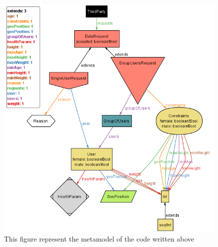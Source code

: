 \begin{figure}[h!]
	\includegraphics[width=1.00\textwidth]{./pictures/world3.png}\par
	\caption{This figure represent the metamodel of the code written above}
\end{figure}

